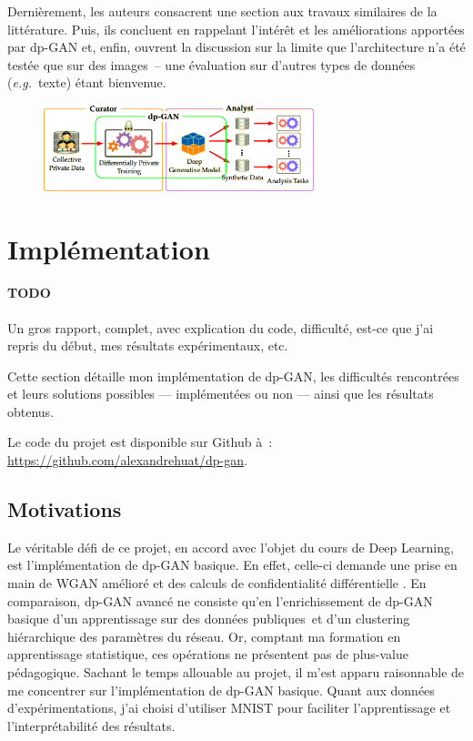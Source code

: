 \documentclass[a4paper,11pt,twocolumn,twoside]{article}
\theoremstyle{definition}
\newcommand{\TODO}[1]{{\color{orange}\sffamily\paragraph{\sffamily TODO} #1\\}}
\newcommand{\eg}{\textit{e.g.}}
\newcommand{\DL}{Deep Learning}
\begin{document}
Dernièrement, les auteurs consacrent une section aux travaux similaires de la littérature. Puis, ils concluent en rappelant l'intérêt et les améliorations apportées par dp-GAN et, enfin, ouvrent la discussion sur la limite que l'architecture n'a été testée que sur des images -- une évaluation sur d'autres types de données (\eg\ texte) étant bienvenue.

\begin{figure}
    \centering
    \includegraphics[width=0.7\textwidth]{dp-gan_role.png}
    \label{dp-gan_role}
\end{figure}

\section{Implémentation}

\TODO{Un gros rapport, complet, avec explication du code, difficulté, est-ce que j'ai repris du début, mes résultats expérimentaux, etc.}

Cette section détaille mon implémentation de dp-GAN, les difficultés rencontrées et leurs solutions possibles --- implémentées ou non --- ainsi que les résultats obtenus.

Le code du projet est disponible sur Github à : \url{https://github.com/alexandrehuat/dp-gan}.

\subsection{Motivations}

Le véritable défi de ce projet, en accord avec l'objet du cours de \DL, est l'implémentation de dp-GAN basique. En effet, celle-ci demande une prise en main de WGAN amélioré et des calculs de confidentialité différentielle \citep{dlwdp, pinq}. En comparaison, dp-GAN avancé ne consiste qu'en l'enrichissement de dp-GAN basique d'un apprentissage sur des données publiques et d'un clustering hiérarchique des paramètres du réseau. Or, comptant ma formation en apprentissage statistique, ces opérations ne présentent pas de plus-value pédagogique. Sachant le temps allouable au projet, il m'est apparu raisonnable de me concentrer sur l'implémentation de dp-GAN basique. Quant aux données d'expérimentations, j'ai choisi d'utiliser MNIST pour faciliter l'apprentissage et l'interprétabilité des résultats.
\end{document}
